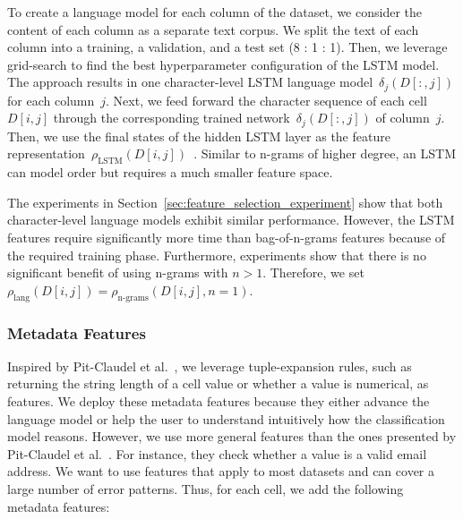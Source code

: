 \begin{description}
To create a language model for each column of the dataset, we consider the content of each column as a separate text corpus. We split the text of each column into a training, a validation, and a test set (8 : 1 : 1). Then, we leverage grid-search to find the best hyperparameter configuration of the LSTM model. The approach results in one character-level LSTM language model~$\delta_{j}(D[:,j])$ for each column~$j$. 
Next, we feed forward the character sequence of each cell $D[i,j]$ through the corresponding trained network~$\delta_{j}(D[:,j])$ of column~$j$. Then, we use the final states of the hidden LSTM layer as the feature representation~$\rho_{\text{LSTM}}(D[i,j])$~\cite{radford2017learning}. 
Similar to n-grams of higher degree, an LSTM can model order but requires a much smaller feature space. 
\end{description}

The experiments in Section~\ref{sec:feature_selection_experiment} show that both character-level language models exhibit similar performance. However, the LSTM features require significantly more time than bag-of-n-grams features because of the required training phase. Furthermore, experiments show that there is no significant benefit of using n-grams with $n>1$. Therefore, we set $\rho_{\text{lang}}(D[i,j]) = \rho_{\text{n-grams}}(D[i,j],n=1)$.

\subsubsection{Metadata Features}
\label{sec:explain_metadata_features}
Inspired by Pit-Claudel et al.~\cite{pit2016outlier}, we leverage tuple-expansion rules, such as returning the string length of a cell value or whether a value is numerical, as features. We deploy these metadata features because they either advance the language model or help the user to understand intuitively how the classification model reasons.
However, we use more general features than the ones presented by Pit-Claudel et al.~\cite{pit2016outlier}. For instance, they check whether a value is a valid email address. We want to use features that apply to most datasets and can cover a large number of error patterns. 
Thus, for each cell, we add the following metadata features: 

